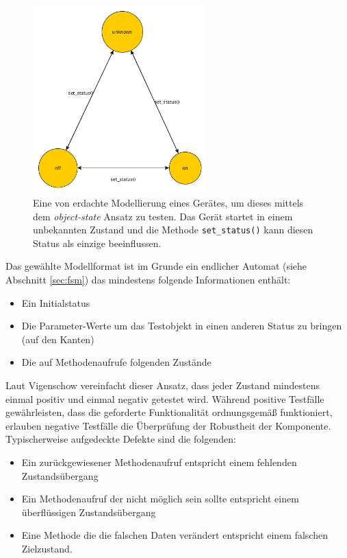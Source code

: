 \begin{figure}[h] 
  \centering
     \includegraphics[width=0.6\textwidth]{figures/mbt_unit.png}
  \caption{Eine von \citeauthor{linz_testing_2014} erdachte Modellierung eines Gerätes, um dieses mittels dem \textit{object-state} Ansatz zu testen. Das Gerät startet in einem unbekannten Zustand und die Methode \texttt{set\_status()} kann diesen Status als einzige beeinflussen.}
  \label{fig:mbt_unit}
\end{figure}

Das gewählte Modellformat ist im Grunde ein endlicher Automat (siehe Abschnitt \ref{sec:fsm}) das mindestens folgende Informationen enthält:

\begin{itemize}
\item Ein Initialstatus
\item Die Parameter-Werte um das Testobjekt in einen anderen Status zu bringen (auf den Kanten)
\item Die auf Methodenaufrufe folgenden Zustände
\end{itemize}

Laut Vigenschow\cite{vigenschow_objektorientiertes_2004} vereinfacht dieser Ansatz, dass jeder Zustand mindestens einmal positiv und einmal negativ getestet wird. Während positive Testfälle gewährleisten, dass die geforderte Funktionalität ordnungsgemäß funktioniert, erlauben negative Testfälle die Überprüfung der Robustheit der Komponente. Typischerweise aufgedeckte Defekte sind die folgenden:

\begin{itemize}
\item Ein zurückgewiesener Methodenaufruf entspricht einem fehlenden Zustandsübergang
\item Ein Methodenaufruf der nicht möglich sein sollte entspricht einem überflüssigen Zustandsübergang
\item Eine Methode die die falschen Daten verändert entspricht einem falschen Zielzustand.
\end{itemize}

